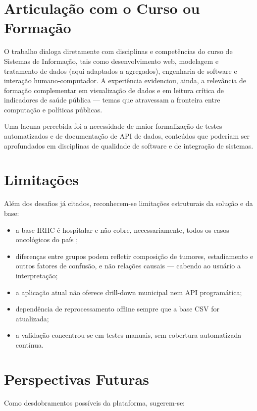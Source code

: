 \section{Articulação com o Curso ou Formação}

O trabalho dialoga diretamente com disciplinas e competências do curso de Sistemas de Informação, tais como desenvolvimento web, modelagem e tratamento de dados (aqui adaptados a agregados), engenharia de software e interação humano-computador. A experiência evidenciou, ainda, a relevância de formação complementar em visualização de dados e em leitura crítica de indicadores de saúde pública --- temas que atravessam a fronteira entre computação e políticas públicas.

Uma lacuna percebida foi a necessidade de maior formalização de testes automatizados e de documentação de \acs{API} de dados, conteúdos que poderiam ser aprofundados em disciplinas de qualidade de software e de integração de sistemas.

\section{Limitações}

Além dos desafios já citados, reconhecem-se limitações estruturais da solução e da base:

\begin{itemize}
	\item a base \acs{IRHC} é hospitalar e não cobre, necessariamente, todos os casos oncológicos do país \cite{inca_irhc};
	\item diferenças entre grupos podem refletir composição de tumores, estadiamento e outros fatores de confusão, e não relações causais --- cabendo ao usuário a interpretação;
	\item a aplicação atual não oferece drill-down municipal nem \acs{API} programática;
	\item dependência de reprocessamento offline sempre que a base \acs{CSV} for atualizada;
	\item a validação concentrou-se em testes manuais, sem cobertura automatizada contínua.
\end{itemize}

\section{Perspectivas Futuras}

Como desdobramentos possíveis da plataforma, sugerem-se:

